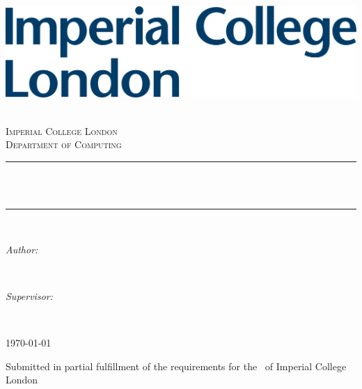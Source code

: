 \begin{titlepage}

\newcommand{\HRule}{\rule{\linewidth}{0.5mm}}
\includegraphics[width=0.4\linewidth]{figures/imperial.png}
\bigskip \bigskip
\center %

\textsc{\LARGE \reporttype}\\[1.5cm]
\textsc{\Large Imperial College London}\\[0.5cm]
\textsc{\large Department of Computing}\\[0.5cm]

\makeatletter
\HRule \\[0.4cm]
{ \huge \bfseries \@title}\\%
\HRule \\[1.5cm]

\begin{minipage}{0.4\textwidth}
\begin{flushleft} \large
\emph{Author:}\\
\@author %
\end{flushleft}
\end{minipage}
~
\begin{minipage}{0.4\textwidth}
\begin{flushright} \large
\emph{Supervisor:} \\
\supervisor
\end{flushright}
\end{minipage}\\[2cm]
\makeatother

{\large \today} %


\vfill %
Submitted in partial fulfillment of the requirements for the \degreetype ~of Imperial College London
    
\end{titlepage}